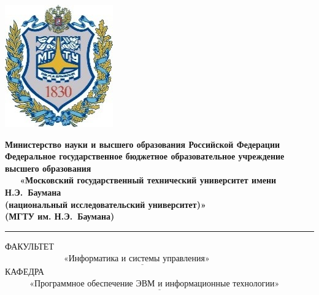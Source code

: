 \documentclass[14pt]{extreport}
\begin{document}
	\thispagestyle{empty}
	\begin{titlepage}
		\noindent \begin{minipage}{0.15\textwidth}
			\includegraphics[width=\linewidth]{b_logo}
		\end{minipage}
		\noindent\begin{minipage}{0.9\textwidth}\centering
			\textbf{Министерство науки и высшего образования Российской Федерации}\\
			\textbf{Федеральное государственное бюджетное образовательное учреждение высшего образования}\\
			\textbf{~~~«Московский государственный технический университет имени Н.Э.~Баумана}\\
			\textbf{(национальный исследовательский университет)»}\\
			\textbf{(МГТУ им. Н.Э.~Баумана)}
		\end{minipage}
		
		\noindent\rule{18cm}{3pt}
		\newline\newline
		\noindent ФАКУЛЬТЕТ $\underline{~~~~~~~~~~~~~~~~~~~~~~~~~~~~~~~\text{«Информатика и системы управления»}~~~~~~~~~~~~~~~~~~~~~~~~~~~~~~~~~~~~~}$ \newline\newline
		\noindent КАФЕДРА $\underline{~~~~~~~~~~~~~\text{«Программное обеспечение ЭВМ и информационные технологии»}~~~~~~~~~~~~~~~~~~~~~~~}$\newline\newline\newline\newline\newline\newline\newline\newline
		

\end{titlepage}
\end{document}
